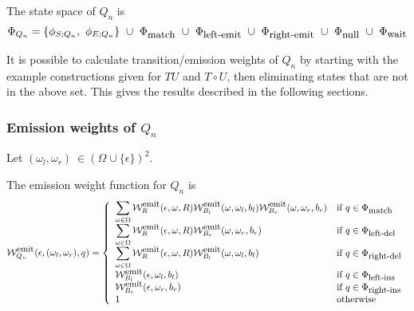 \documentclass{article}
\newcommand\gappedalphabet[1]{(\Omega_{#1} \cup \{\epsilon\})}
\newcommand\gapsquared{\gappedalphabet{}^2}
\newcommand\compose{}
\newcommand\fork{\circ}
\newcommand\States{\Phi}
\newcommand\statesof[1]{\States_{#1}}
\newcommand\startstateof[1]{\phi_{S;#1}}
\newcommand\laststateof[1]{\phi_{E;#1}}
\newcommand\weight{{\cal W}}
\newcommand\weightfunof[1]{\weight_{#1}}
\newcommand\emitweightfun[1]{\weightfunof{#1}^{\mbox{\small emit}}}
\newcommand\stateset[1]{\statesof{\mbox{\small #1}}}
\newcommand\matchsuffix{match}
\newcommand\nullsuffix{null}
\newcommand\leftinsertsuffix{left-ins}
\newcommand\rightinsertsuffix{right-ins}
\newcommand\leftdeletesuffix{left-del}
\newcommand\rightdeletesuffix{right-del}
\newcommand\leftemitsuffix{left-emit}
\newcommand\rightemitsuffix{right-emit}
\newcommand\qwaitsuffix{wait}
\newcommand\matchstates{\stateset{\matchsuffix}}
\newcommand\nullstates{\stateset{\nullsuffix}}
\newcommand\leftinsertstates{\stateset{\leftinsertsuffix}}
\newcommand\rightinsertstates{\stateset{\rightinsertsuffix}}
\newcommand\leftdeletestates{\stateset{\leftdeletesuffix}}
\newcommand\rightdeletestates{\stateset{\rightdeletesuffix}}
\newcommand\leftemitstates{\stateset{\leftemitsuffix}}
\newcommand\rightemitstates{\stateset{\rightemitsuffix}}
\newcommand\qwaitstates{\stateset{\qwaitsuffix}}
\begin{document}
The state space of $Q_n$ is
\[
\statesof{Q_n} = \{ \startstateof{Q_n},\ \laststateof{Q_n} \}\ \cup\ \matchstates\ \cup\ \leftemitstates\ \cup\ \rightemitstates\ \cup\ \nullstates\ \cup\ \qwaitstates
\]

It is possible to calculate transition/emission weights of $Q_n$
by starting with the example constructions given for $T \compose U$ and $T \fork U$,
then eliminating states that are not in the above set.
This gives the results described in the following sections.

\subsubsection{Emission weights of $Q_n$}

Let $(\omega_l,\omega_r)\ \in \gapsquared$.

The emission weight function for $Q_n$ is
\[
\emitweightfun{Q_n}(\epsilon,(\omega_l,\omega_r),q) = \left\{
\begin{array}{ll}
\displaystyle
\sum_{\omega \in \Omega} \emitweightfun{R}(\epsilon,\omega,R)
 \emitweightfun{B_l}(\omega,\omega_l,b_l)
 \emitweightfun{B_r}(\omega,\omega_r,b_r)
 & \mbox{if $q \in \matchstates$} \\
\displaystyle
\sum_{\omega \in \Omega} \emitweightfun{R}(\epsilon,\omega,R)
 \emitweightfun{B_r}(\omega,\omega_r,b_r)
 & \mbox{if $q \in \leftdeletestates$} \\
\displaystyle
\sum_{\omega \in \Omega} \emitweightfun{R}(\epsilon,\omega,R)
 \emitweightfun{B_l}(\omega,\omega_l,b_l)
 & \mbox{if $q \in \rightdeletestates$} \\
 \emitweightfun{B_l}(\epsilon,\omega_l,b_l)
 & \mbox{if $q \in \leftinsertstates$} \\
 \emitweightfun{B_r}(\epsilon,\omega_r,b_r)
 & \mbox{if $q \in \rightinsertstates$} \\
1
 & \mbox{otherwise}
\end{array}
\right.
\]
\end{document}
